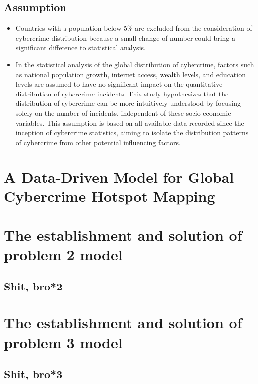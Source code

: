 \documentclass[12pt]{article}
\begin{document}
	\subsection{Assumption}\label{subsec:assumption} %
		\begin{itemize}
			\item Countries with a population below 5\% are excluded from the consideration of cybercrime distribution because
				a small change of number could bring a significant difference to statistical analysis.
			\item In the statistical analysis of the global distribution of cybercrime,
				factors such as national population growth, internet access, wealth levels, and education levels
				are assumed to have no significant impact on the quantitative distribution of cybercrime incidents.
				This study hypothesizes that the distribution of cybercrime can be more intuitively understood by focusing solely on the number of incidents,
				independent of these socio-economic variables.
				This assumption is based on all available data recorded since the inception of cybercrime statistics,
				aiming to isolate the distribution patterns of cybercrime from other potential influencing factors.
		\end{itemize}

\section{A Data-Driven Model for Global Cybercrime Hotspot Mapping}\label{sec:a-data-driven-model-for-global-cybercrime-hotspot-mapping}


\section{The establishment and solution of problem 2 model}\label{sec:the-establishment-and-solution-of-problem-2-model} %
	\subsection{Shit, bro*2}\label{subsec:shit-bro*2} %
	
\section{The establishment and solution of problem 3 model}\label{sec:the-establishment-and-solution-of-problem-3-model} %
	\subsection{Shit, bro*3}\label{subsec:shit-bro*3} %
	
\end{document}
